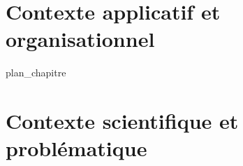 %
\chapter{Contexte applicatif et organisationnel}
\label{chap:1}
{plan_chapitre}
%
\chapter{Contexte scientifique et problématique}
\label{chap:2}
%
%
